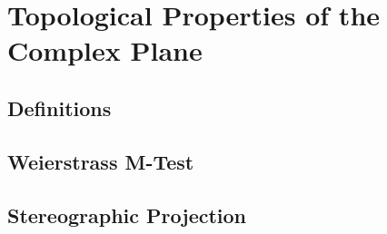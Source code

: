 \documentclass[]{article}
\begin{document}
\section{Topological Properties of the Complex Plane}
    \subsection{Definitions}
    \subsection{Weierstrass M-Test}
    \subsection{Stereographic Projection}
\end{document}
